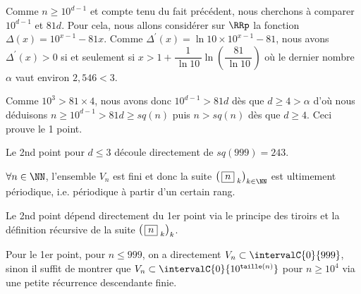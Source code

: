 \begin{proof*}
	Comme $n \geqslant 10^{d-1}$ et compte tenu du fait précédent, nous cherchons à comparer $10^{d-1}$ et $81d$.
	Pour cela, nous allons considérer sur $\RRp$ la fonction $\Delta(x) = 10^{x-1} - 81x$. 
	Comme $\Delta^\prime(x) = \ln 10 \times 10^{x-1} - 81$,
	nous avons $\Delta^\prime(x) > 0$ 
	si et seulement si $x > 1 + \dfrac{1}{\, \ln 10 \,} \ln \left( \dfrac{81}{\, \ln 10 \,} \right)$
	où le dernier nombre $\alpha$ vaut environ $2,\!546 < 3$.


	\medskip
	
	Comme $10^3 > 81 \times 4$, nous avons donc  $10^{d-1} > 81d$ dès que $d \geqslant 4 > \alpha$
	d'où nous déduisons $n \geqslant 10^{d-1} > 81d \geqslant sq(n)$
	puis $n > sq(n)$ dès que $d \geqslant 4$. Ceci prouve le 1\ier{} point.


	\bigskip
	
	Le 2nd point pour $d \leqslant 3$ découle directement de $sq(999) = 243$.
\end{proof*}




\medskip

\begin{fact}
	$\forall n \in \NN$, l'ensemble $V_n$ est fini et donc la suite $\left( \, \sqseq{n}{k} \right)_{k \in \NN}$ est ultimement périodique, i.e. périodique à partir d'un certain rang.
\end{fact}

\begin{proof*}
	Le 2nd point dépend directement du 1er point via le principe des tiroirs et la définition récursive de la suite $\left( \, \fbox{$n$}_{\,\,k} \right)_k$.
	
	\medskip
	
	Pour le 1er point, pour $n \leqslant 999$, on a directement $V_n \subset \intervalC{0}{999}$,
	sinon il suffit de montrer que $V_n \subset \intervalC{0}{10^{\taille(n)}}$ pour $n \geqslant 10^4$ via une petite récurrence descendante finie.
\end{proof*}